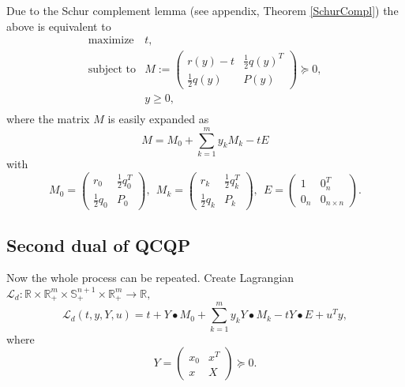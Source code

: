 \documentclass[12pt]{book}
\theoremstyle{definition}
\begin{document}
Due to the Schur complement lemma (see appendix, Theorem \ref{SchurCompl}) the above is equivalent to
\begin{equation*}
\begin{array}{ll}
\mbox{maximize} & t, \\
\mbox{subject to}& M:=\left(\begin{array}{ll}
r(y)-t & \frac{1}{2}q(y)^T \\
\frac{1}{2}q(y) & P(y)
\end{array}\right)\succeq 0,
 \\
&y \geq 0,\\
\end{array} 
\end{equation*}
where the matrix $M$ is easily expanded as 
\begin{equation*}
M= M_0 + \sum_{k=1}^m y_kM_k  - tE
\end{equation*}
with
\begin{equation*}
M_0 = \left(\begin{array}{rr} r_0& \frac{1}{2}q_0^T\\ \frac{1}{2}q_0 & P_0 \end{array}\right) , \ \ 
M_k = \left(\begin{array}{ll} r_k & \frac{1}{2}q_k^T\\ \frac{1}{2}q_k & P_k \end{array}\right), \ \ 
E =  \left(\begin{array}{ll} 1 & 0_n^T\\ 0_n & 0_{n\times n} \end{array}\right). 
\end{equation*}

\subsection{Second dual of QCQP}

Now the whole process can be repeated. Create Lagrangian 
$\mathcal{L}_d: \mathbb{R}\times\mathbb{R}^m_+\times\mathbb{S}^{n+1}_+\times\mathbb{R}^m_+ \rightarrow \mathbb{R},$
\begin{equation*}
\mathcal{L}_d(t,y,Y,u) = t + Y\bullet M_0 + \sum_{k=1}^m y_kY\bullet M_k - tY\bullet E  + u^Ty,
\end{equation*}
where
\begin{equation*}
Y = \left(\begin{array}{ll}
x_0 & x^T \\
x & X
\end{array}\right)\succeq 0.
\end{equation*}
\end{document}
